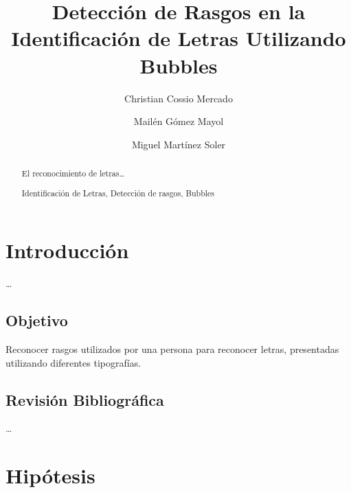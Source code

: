 \documentclass[runningheads,a4paper]{llncs}
\newcommand{\keywords}[1]{\par\addvspace\baselineskip
\noindent\keywordname\enspace\ignorespaces#1}
\begin{document}
\mainmatter

\title{Detección de Rasgos en la Identificación de Letras Utilizando Bubbles}
\author{Christian Cossio Mercado \and Mail\'en G\'omez Mayol \and Miguel Mart\'inez Soler}


\maketitle
\begin{abstract}
El reconocimiento de letras\ldots
\keywords{Identificaci\'on de Letras, Detecci\'on de rasgos, Bubbles}
\end{abstract}


\section{Introducción}
\label{sec:Introduccion}
\ldots

\subsection{Objetivo}
Reconocer rasgos utilizados por una persona para reconocer letras, presentadas utilizando diferentes tipografías.

\subsection{Revisi\'on Bibliográfica}
\label{sec:RevisionBibliografica}
\ldots


\section{Hipótesis}
\end{document}
